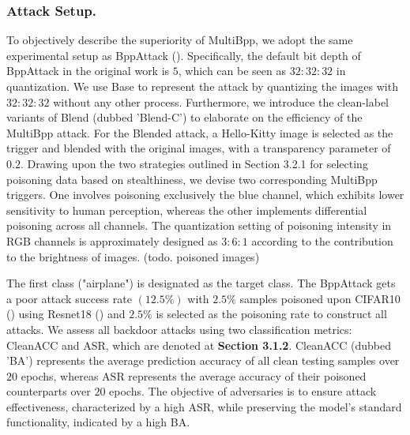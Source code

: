 \documentclass{article}
\begin{document}
\subsubsection{Attack Setup.}
To objectively describe the superiority of MultiBpp, we adopt the same experimental setup as BppAttack (\citet{wang2022bppattack}). Specifically, the default bit depth of BppAttack in the original work is \(5\), which can be seen as \(32:32:32\) in quantization. We use Base to represent the attack by quantizing the images with \(32:32:32\) without any other process. Furthermore, we introduce the clean-label variants of Blend (dubbed 'Blend-C') to elaborate on the efficiency of the MultiBpp attack. For the Blended attack, a Hello-Kitty image is selected as the trigger and blended with the original images, with a transparency parameter of \(0.2\). Drawing upon the two strategies outlined in Section 3.2.1 for selecting poisoning data based on stealthiness, we devise two corresponding MultiBpp triggers. One involves poisoning exclusively the blue channel, which exhibits lower sensitivity to human perception, whereas the other implements differential poisoning across all channels. The quantization setting of poisoning intensity in RGB channels is approximately designed as \(3:6:1\) according to the contribution to the brightness of images. (todo. poisoned images)

The first class ("airplane") is designated as the target class. The BppAttack gets a poor attack success rate \((12.5\%)\) with \(2.5\%\) samples poisoned upon CIFAR10 (\cite{krizhevsky2009learning}) using Resnet18 (\cite{he2016deep}) and \(2.5\%\) is selected as the poisoning rate to construct all attacks. We assess all backdoor attacks using two classification metrics: CleanACC and ASR, which are denoted at \textbf{Section 3.1.2}. CleanACC (dubbed 'BA') represents the average prediction accuracy of all clean testing samples over \(20\) epochs, whereas ASR represents the average accuracy of their poisoned counterparts over \(20\) epochs. The objective of adversaries is to ensure attack effectiveness, characterized by a high ASR, while preserving the model's standard functionality, indicated by a high BA. 
\end{document}
